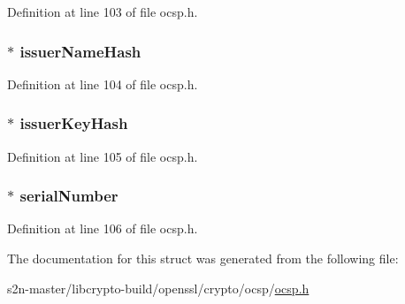 Definition at line 103 of file ocsp.\+h.

\subsubsection[{\texorpdfstring{issuer\+Name\+Hash}{issuerNameHash}}]{ $\ast$ issuer\+Name\+Hash}\hypertarget{structocsp__cert__id__st_a104ad82020e11e66fc05a8d468c809c9}{}\label{structocsp__cert__id__st_a104ad82020e11e66fc05a8d468c809c9}


Definition at line 104 of file ocsp.\+h.

\subsubsection[{\texorpdfstring{issuer\+Key\+Hash}{issuerKeyHash}}]{ $\ast$ issuer\+Key\+Hash}\hypertarget{structocsp__cert__id__st_ab16432e80c2afe5f2d007d6d888721cc}{}\label{structocsp__cert__id__st_ab16432e80c2afe5f2d007d6d888721cc}


Definition at line 105 of file ocsp.\+h.

\subsubsection[{\texorpdfstring{serial\+Number}{serialNumber}}]{ $\ast$ serial\+Number}\hypertarget{structocsp__cert__id__st_a957a5fd70cdff1e46a8df4d4bac22348}{}\label{structocsp__cert__id__st_a957a5fd70cdff1e46a8df4d4bac22348}


Definition at line 106 of file ocsp.\+h.



The documentation for this struct was generated from the following file\+:\begin{DoxyCompactItemize}
\item 
s2n-\/master/libcrypto-\/build/openssl/crypto/ocsp/\hyperlink{crypto_2ocsp_2ocsp_8h}{ocsp.\+h}\end{DoxyCompactItemize}
